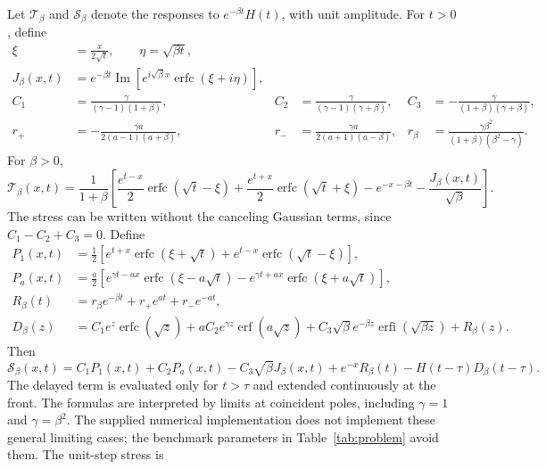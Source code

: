 \documentclass[11pt]{article}
\begin{document}
Let $\mathcal T_\beta$ and $\mathcal S_\beta$ denote the responses to
$e^{-\beta t}H(t)$, with unit amplitude. For $t>0$, define
\begin{align}
 \xi&=\frac{x}{2\sqrt t},\qquad \eta=\sqrt{\beta t},\\
 J_\beta(x,t)&=e^{-\beta t}
  \operatorname{Im}\left[e^{i\sqrt\beta x}
     \operatorname{erfc}(\xi+i\eta)\right],\\
 C_1&=\frac{\gamma}{(\gamma-1)(1+\beta)},&
 C_2&=\frac{\gamma}{(\gamma-1)(\gamma+\beta)},&
 C_3&=-\frac{\gamma}{(1+\beta)(\gamma+\beta)},\\
 r_+&=-\frac{\gamma a}{2(a-1)(a+\beta)},&
 r_-&=\frac{\gamma a}{2(a+1)(a-\beta)},&
 r_\beta&=\frac{\gamma\beta^2}{(1+\beta)(\beta^2-\gamma)}.
\end{align}
For $\beta>0$,
\begin{equation}
 \mathcal T_\beta(x,t)=\frac{1}{1+\beta}\left[
 \frac{e^{t-x}}{2}\operatorname{erfc}(\sqrt t-\xi)
 +\frac{e^{t+x}}{2}\operatorname{erfc}(\sqrt t+\xi)
 -e^{-x-\beta t}-\frac{J_\beta(x,t)}{\sqrt\beta}\right].
 \label{eq:corrected-T}
\end{equation}
The stress can be written without the canceling Gaussian terms, since
$C_1-C_2+C_3=0$. Define
\begin{align}
 P_1(x,t)&=\frac12\left[
 e^{t+x}\operatorname{erfc}(\xi+\sqrt t)
 +e^{t-x}\operatorname{erfc}(\sqrt t-\xi)\right],\\
 P_a(x,t)&=\frac a2\left[
 e^{\gamma t-a x}\operatorname{erfc}(\xi-a\sqrt t)
 -e^{\gamma t+a x}\operatorname{erfc}(\xi+a\sqrt t)\right],\\
 R_\beta(t)&=r_\beta e^{-\beta t}+r_+e^{at}+r_-e^{-at},\\
 D_\beta(z)&=C_1 e^z\operatorname{erfc}(\sqrt z)
 +aC_2e^{\gamma z}\operatorname{erf}(a\sqrt z)
 +C_3\sqrt\beta e^{-\beta z}\operatorname{erfi}(\sqrt{\beta z})
 +R_\beta(z).
\end{align}
Then
\begin{equation}
 \mathcal S_\beta(x,t)=C_1P_1(x,t)+C_2P_a(x,t)
 -C_3\sqrt\beta J_\beta(x,t)+e^{-x}R_\beta(t)
 -H(t-\tau)D_\beta(t-\tau).
 \label{eq:corrected-stress}
\end{equation}
The delayed term is evaluated only for $t>\tau$ and extended continuously
at the front. The formulas are interpreted by limits at coincident poles,
including $\gamma=1$ and $\gamma=\beta^2$. The supplied numerical
implementation does not implement these general limiting cases; the
benchmark parameters in Table~\ref{tab:problem} avoid them. The unit-step stress is
\end{document}
